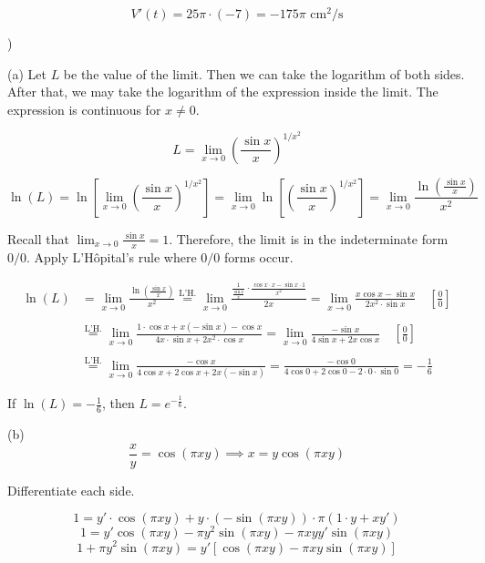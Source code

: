 \documentclass{article}
\begin{document}
\[V'(t)=25\pi\cdot(-7)=\boxed{-175\pi\text{ cm}^2\text{/s}}\]

\hfill

)

\hfill

\noindent (a) Let $L$ be the value of the limit. Then we can take the logarithm of both sides. After that, we may take the logarithm of the expression inside the limit. The expression is continuous for $x\neq0$.

\[L=\lim_{x\to0}\left(\frac{\sin x}x\right)^{1/x^2}\]

\[\ln(L) = \ln\left[\lim_{x\to0}\left(\frac{\sin x}x\right)^{1/x^2}\right]=\lim_{x\to0}\ln\left[\left(\frac{\sin x}x\right)^{1/x^2}\right]=\lim_{x\to0}\frac{\ln\left(\frac{\sin x}x\right)}{x^2}\]

\hfill

\noindent Recall that $\displaystyle \lim_{x\to0}\frac{\sin x}x=1$. Therefore, the limit is in the indeterminate form $0/0$. Apply L'Hôpital's rule where $0/0$ forms occur.

\begin{align*}
\ln(L)&=\lim_{x\to0}\frac{\ln\left(\frac{\sin x}x\right)}{x^2}\overset{\text{L'H.}}{=}\lim_{x\to0}\frac{\displaystyle\frac1{\frac{\sin x}x}\cdot\frac{\cos x\cdot x-\sin x\cdot1}{x^2}}{2x}=\lim_{x\to0}\frac{x\cos x-\sin x}{2x^2\cdot\sin x}\quad\left[\frac00\right]\\\\&\overset{\text{L'H.}}{=}\lim_{x\to0}\frac{1\cdot\cos x+x(-\sin x)-\cos x}{4x\cdot\sin x+2x^2\cdot\cos x}=\lim_{x\to0}\frac{-\sin x}{4\sin x+2x\cos x}\quad\left[\frac00\right]\\\\&\overset{\text{L'H.}}{=}\lim_{x\to0}\frac{-\cos x}{4\cos x+2\cos x+2x(-\sin x)}=\frac{-\cos0}{4\cos0+2\cos0-2\cdot0\cdot\sin0}=-\frac16
\end{align*}

\noindent If $\displaystyle \ln(L)=-\frac16$, then $\boxed{L=e^{\textstyle-\frac16}}$.

\hfill

\noindent (b)
\[\frac xy=\cos(\pi xy)\implies x=y\cos(\pi xy)\]

\hfill

\noindent Differentiate each side.

\[1=y'\cdot\cos(\pi xy)+y\cdot(-\sin(\pi xy))\cdot\pi(1\cdot y+xy')\]
\[1=y'\cos(\pi xy)-\pi y^2\sin(\pi xy)-\pi xyy'\sin(\pi xy)\]
\[1+\pi y^2\sin(\pi xy)=y'\left[\cos(\pi xy)-\pi xy\sin(\pi xy)\right]\]
\end{document}
